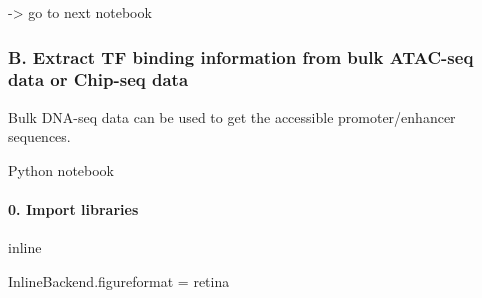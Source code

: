 \documentclass[letterpaper,10pt,english]{sphinxmanual}
\begin{document}
-\textgreater{} go to next notebook


\subsubsection{B. Extract TF binding information from bulk ATAC-seq data or Chip-seq data}
\label{\detokenize{tutorials/atac:b-extract-tf-binding-information-from-bulk-atac-seq-data-or-chip-seq-data}}
Bulk DNA-seq data can be used to get the accessible promoter/enhancer sequences.

Python notebook


\paragraph{0. Import libraries}
\label{\detokenize{notebooks/01_ATAC-seq_data_processing/option2_Bulk_ATAC-seq_data/01_preprocess_Bulk_ATAC_seq_peak_data:0.-Import-libraries}}\label{\detokenize{notebooks/01_ATAC-seq_data_processing/option2_Bulk_ATAC-seq_data/01_preprocess_Bulk_ATAC_seq_peak_data::doc}}
{
\begin{sphinxVerbatim}[commandchars=\\\{\}]
\llap{\color{nbsphinxin}[1]:\,\hspace{\fboxrule}\hspace{\fboxsep}}   
   
   
 inline

   

     
     

 InlineBackend.figure\PYGZus{}format = \PYGZsq{}retina\PYGZsq{}

\PYG{p}{[}\PYG{p}{]}  \PYG{p}{[} \PYG{p}{]}
\PYG{p}{[}\PYG{p}{]}  

\end{sphinxVerbatim}
}
\end{document}
